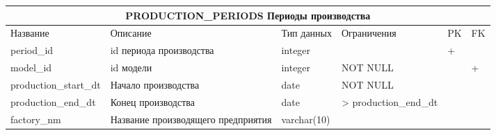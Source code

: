 \documentclass{article}
\begin{document}
\begin{tabular}{ |p{4cm}|p{4cm}|p{2.5cm}|p{3.5cm}|p{2cm}|p{1cm}| }
\hline
\multicolumn{6}{|c|}{PRODUCTION\_PERIODS Периоды производства} \\
\hline
Название & Описание & Тип данных & Ограничения & PK & FK\\
\hline
period\_id                          &   %
id периода производства             &   %
integer                             &   %
                                    &   %
 +                                  &   %
                                    \\  %
\hline
model\_id                           &   %
id модели                           &   %
integer                             &   %
NOT NULL                            &   %
                                    &   %
 +                                  \\  %
\hline
production\_start\_dt               &   %
Начало производства                 &   %
date                                &   %
NOT NULL                            &   %
                                    &   %
                                    \\  %
\hline
production\_end\_dt                 &   %
Конец производства                  &   %
date                                &   %
> production\_end\_dt               &   %
                                    &   %
                                    \\  %
\hline
factory\_nm                         &   %
Название производящего предприятия  &   %
varchar(10)                         &   %
                                    &   %
                                    &   %
                                    \\  %
\hline
\end{tabular}
\end{document}
